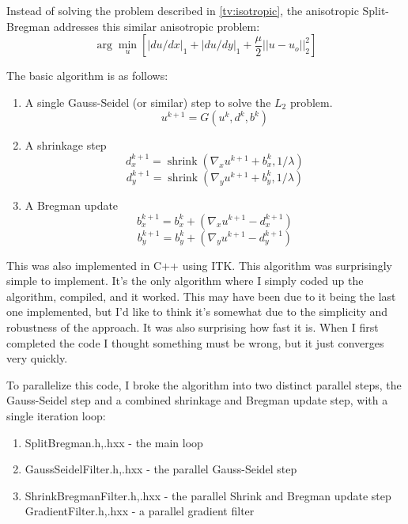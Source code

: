 \documentclass[11pt]{article}
\DeclareMathOperator{\shrink}{shrink}
\begin{document}
Instead of solving the problem described in \ref{tv:isotropic}, the anisotropic Split-Bregman addresses this similar anisotropic problem:
\begin{equation}
\arg \min_{u}\left[ |du/dx|_1 + |du/dy|_1 + \frac{\mu}{2}||u-u_o||^2_2 \right]
\label{tv:anisotropic}
\end{equation}

The basic algorithm is as follows:
\begin{enumerate}
\item A single Gauss-Seidel (or similar) step to solve the $L_2$ problem.
\begin{equation*}
u^{k+1} = G(u^k,d^k,b^k)
\end{equation*}
\item A shrinkage step
\begin{equation*}
d^{k+1}_x = \shrink(\nabla_x u^{k+1} + b^k_x, 1/\lambda)
\end{equation*}
\begin{equation*}
d^{k+1}_y = \shrink(\nabla_y u^{k+1} + b^k_y, 1/\lambda)
\end{equation*}
\item A Bregman update
\begin{equation*}
b^{k+1}_x = b^k_x + (\nabla_x u^{k+1} - d^{k+1}_x)
\end{equation*}
\begin{equation*}
b^{k+1}_y = b^k_y + (\nabla_y u^{k+1} - d^{k+1}_y)
\end{equation*}

\end{enumerate}

This was also implemented in C++ using ITK.
This algorithm was surprisingly simple to implement.
It's the only algorithm where I simply coded up the algorithm, compiled, and it worked.
This may have been due to it being the last one implemented, but I'd like to think it's somewhat due to the simplicity and robustness of the approach.
It was also surprising how fast it is.  
When I first completed the code I thought something must be wrong, but it just converges very quickly.

To parallelize this code, I broke the algorithm into two distinct parallel steps, the Gauss-Seidel step and a combined shrinkage and Bregman update step, with a single iteration loop:

\begin{enumerate}
\item SplitBregman.h,.hxx - the main loop
\item GaussSeidelFilter.h,.hxx - the parallel Gauss-Seidel step
\item ShrinkBregmanFilter.h,.hxx - the parallel Shrink and Bregman update step
GradientFilter.h,.hxx - a parallel gradient filter
\end{enumerate}
\end{document}
